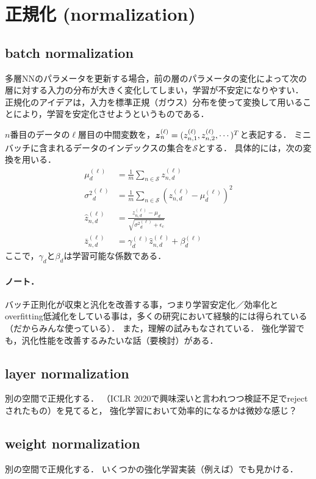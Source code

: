 \section{正規化 (normalization)}
\subsection{batch normalization \cite{ioffe2015batch}}
多層NNのパラメータを更新する場合，前の層のパラメータの変化によって次の層に対する入力の分布が大きく変化してしまい，学習が不安定になりやすい．
正規化のアイデアは，入力を標準正規（ガウス）分布を使って変換して用いることにより，学習を安定化させようというものである．

$n$番目のデータの$\ell$層目の中間変数を，$\mbox{\boldmath $z$}^{(\ell)}_n=(z^{(\ell)}_{n,1},z^{(\ell)}_{n,2},\cdots)^T$と表記する．
ミニバッチに含まれるデータのインデックスの集合を$\mathcal{S}$とする．
具体的には，次の変換を用いる．
\begin{align*}
\mu_{d}^{(\ell)} &= \frac{1}{m}\sum_{n\in\mathcal{S}}z^{(\ell)}_{n,d}
\\
{\sigma^2}^{(\ell)}_{d}
&=
\frac{1}{m} \sum_{n\in\mathcal{S}} (z^{(\ell)}_{n,d}-\mu_{d}^{(\ell)})^2
\\
\hat{z}^{(\ell)}_{n,d}
&=
\frac{z^{(\ell)}_{n,d}-\mu_{d}}
{\sqrt{{\sigma^2}^{(\ell)}_{d}+\epsilon_c}}
\\
\bar{z}^{(\ell)}_{n,d}
&=
\gamma^{(\ell)}_d \hat{z}^{(\ell)}_{n,d} + \beta^{(\ell)}_d
\end{align*}
ここで，$\gamma_d$と$\beta_d$は学習可能な係数である．


\paragraph{ノート．}
バッチ正則化が収束と汎化を改善する事，つまり学習安定化／効率化とoverfitting低減化をしている事は，多くの研究において経験的には得られている（だからみんな使っている）．
また，理解の試みもなされている\cite{luo2019towards}．
強化学習でも，汎化性能を改善するみたいな話（要検討）がある\cite{cobbe2019quantifying}．



\subsection{layer normalization \cite{ba2016layer}}
別の空間で正規化する．
\cite{bhatt2019crossnorm}（ICLR 2020で興味深いと言われつつ検証不足でrejectされたもの）を見てると，
強化学習において効率的になるかは微妙な感じ？


\subsection{weight normalization \cite{salimans2016weight,luo2019towards}}
別の空間で正規化する．
いくつかの強化学習実装（例えば\cite{clavera2018model,huang2019learning}）でも見かける．
